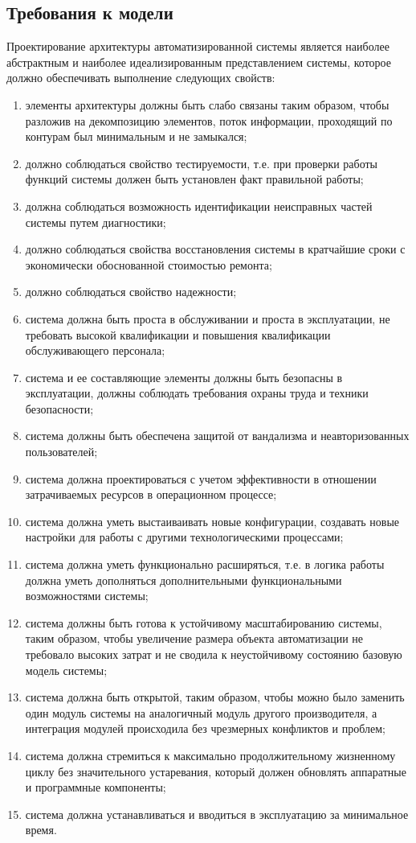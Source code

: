 \subsection{Требования к модели}\label{sec:ch2/sec3/sub5}
Проектирование архитектуры автоматизированной системы является наиболее абстрактным и наиболее идеализированным представлением системы, которое должно обеспечивать выполнение следующих свойств:
\begin{enumerate}
\item элементы архитектуры должны быть слабо связаны таким образом, чтобы разложив на декомпозицию элементов, поток информации, проходящий по контурам был минимальным и не замыкался;
\item должно соблюдаться свойство тестируемости, т.е. при проверки работы функций системы должен быть установлен факт правильной работы;
\item должна соблюдаться возможность идентификации неисправных частей системы путем диагностики;
\item должно соблюдаться свойства восстановления системы в кратчайшие сроки с экономически обоснованной стоимостью ремонта;
\item должно соблюдаться свойство надежности;
\item система должна быть проста в обслуживании и проста в эксплуатации, не требовать высокой квалификации и повышения квалификации обслуживающего персонала;
\item система и ее составляющие элементы должны быть безопасны в эксплуатации, должны соблюдать требования охраны труда и техники безопасности;
\item система должны быть обеспечена защитой от вандализма и неавторизованных пользователей;
\item система должна проектироваться с учетом эффективности в отношении затрачиваемых ресурсов в  операционном процессе;
\item система должна уметь выстаиваивать новые конфигурации, создавать новые настройки для работы с другими технологическими процессами;
\item система должна уметь функционально расширяться, т.е. в логика работы должна уметь дополняться дополнительными функциональными возможностями системы;
\item система должны быть готова к устойчивому масштабированию системы, таким образом, чтобы увеличение размера объекта автоматизации не требовало высоких затрат и не сводила к неустойчивому состоянию базовую модель системы;
\item система должна быть открытой, таким образом, чтобы можно было заменить один модуль системы на аналогичный модуль другого производителя, а интеграция модулей происходила без чрезмерных конфликтов и проблем;
\item система должна стремиться к максимально продолжительному жизненному циклу без значительного устаревания, который должен обновлять аппаратные и программные компоненты;
\item система должна устанавливаться и вводиться в эксплуатацию за минимальное время.
\end{enumerate}

